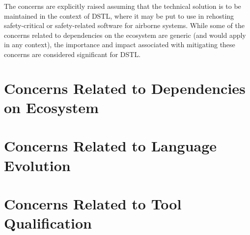 \documentclass{llncs}
\begin{document}
The concerns are explicitly raised assuming that the technical solution is to be maintained in the context of DSTL, where it
may be put to use in rehosting safety-critical or safety-related software for airborne systems. While some of the concerns
related to dependencies on the ecosystem are generic (and would apply in any context), the importance and impact associated
with mitigating these concerns are considered significant for DSTL. 



\section{Concerns Related to Dependencies on Ecosystem}


\section{Concerns Related to Language Evolution}

%
%

\section{Concerns Related to Tool Qualification}




\renewcommand{\baselinestretch}{1.0}
\end{document}
